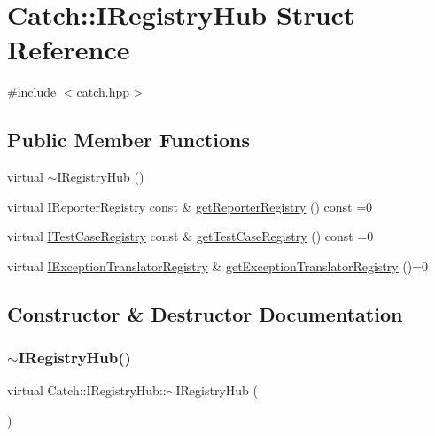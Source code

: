 \hypertarget{struct_catch_1_1_i_registry_hub}{}\section{Catch\+:\+:I\+Registry\+Hub Struct Reference}
\label{struct_catch_1_1_i_registry_hub}


{\ttfamily \#include $<$catch.\+hpp$>$}

\subsection*{Public Member Functions}
\begin{DoxyCompactItemize}
\item 
virtual \hyperlink{struct_catch_1_1_i_registry_hub_a050de0f27f96888c8b410992146c9a09}{$\sim$\+I\+Registry\+Hub} ()
\item 
virtual I\+Reporter\+Registry const  \& \hyperlink{struct_catch_1_1_i_registry_hub_a55534563f7ecf7e20ec1e37285ebe54d}{get\+Reporter\+Registry} () const =0
\item 
virtual \hyperlink{struct_catch_1_1_i_test_case_registry}{I\+Test\+Case\+Registry} const  \& \hyperlink{struct_catch_1_1_i_registry_hub_af4f6255f0c0f8f1f179fa9d7d4843076}{get\+Test\+Case\+Registry} () const =0
\item 
virtual \hyperlink{struct_catch_1_1_i_exception_translator_registry}{I\+Exception\+Translator\+Registry} \& \hyperlink{struct_catch_1_1_i_registry_hub_a3606988da110c016c5af3ae63454eb78}{get\+Exception\+Translator\+Registry} ()=0
\end{DoxyCompactItemize}


\subsection{Constructor \& Destructor Documentation}
\hypertarget{struct_catch_1_1_i_registry_hub_a050de0f27f96888c8b410992146c9a09}{}\label{struct_catch_1_1_i_registry_hub_a050de0f27f96888c8b410992146c9a09} 
\subsubsection{\texorpdfstring{$\sim$\+I\+Registry\+Hub()}{~IRegistryHub()}}
{\footnotesize\ttfamily virtual Catch\+::\+I\+Registry\+Hub\+::$\sim$\+I\+Registry\+Hub (\begin{DoxyParamCaption}{ }\end{DoxyParamCaption})\hspace{0.3cm}{\ttfamily [virtual]}}



